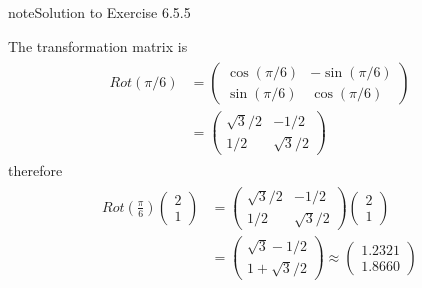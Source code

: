 \documentclass[letterpaper,10pt,english]{jupyterBook}
\begin{document}
\begin{sphinxadmonition}{note}{Solution to Exercise 6.5.5}



\sphinxAtStartPar
The transformation matrix is
\begin{equation*}
\begin{split} \begin{align*}
    Rot\left(\pi/6\right) &= \begin{pmatrix} 
        \cos(\pi/6) & -\sin(\pi/6) \\
        \sin(\pi/6) & \cos(\pi/6)
    \end{pmatrix}  \\
    &= \begin{pmatrix}
        \sqrt{3}/2 & -1/2 \\
        1/2 & \sqrt{3}/2
    \end{pmatrix}
\end{align*} \end{split}
\end{equation*}
\sphinxAtStartPar
therefore
\begin{equation*}
\begin{split} \begin{align*}
    Rot\left(\frac{\pi}{6}\right) \begin{pmatrix} 2 \\ 1 \end{pmatrix}
    &= \begin{pmatrix}
        \sqrt{3}/2 & -1/2 \\
        1/2 & \sqrt{3}/2
    \end{pmatrix}
    \begin{pmatrix} 2 \\ 1 \end{pmatrix} \\
    &= \begin{pmatrix} \sqrt{3} - 1/2 \\ 1 + \sqrt{3}/2 \end{pmatrix}
    \approx \begin{pmatrix} 1.2321 \\ 1.8660 \end{pmatrix}
\end{align*} \end{split}
\end{equation*}\end{sphinxadmonition}
 \label{_pages/A6_Linear_transformations_exercises_solutions:_pages/A6_Linear_transformations_exercises_solutions-solution-5}
\end{document}

